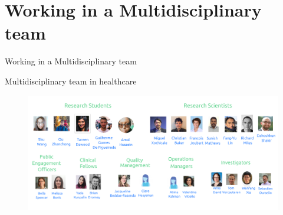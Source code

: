 \section{Working in a Multidisciplinary team}


{
\begin{frame}{}

\BigSizeFont
\begin{center}
    Working in a Multidisciplinary team
\end{center}

\end{frame}
}


{
\begin{frame}{Multidisciplinary team in healthcare}

  \begin{figure}
  \centering
  \includegraphics[width=1.0\textwidth]{./../figures/team/all/versions/drawing-v05.png}
  \end{figure}

\end{frame}
}

%
%
%
%
%


